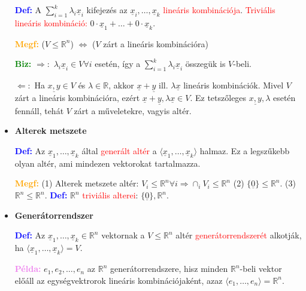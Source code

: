 \documentclass[../../szobeli.tex]{subfiles}
\begin{document}
\begin{itemize}
            \textcolor{blue}{\textbf{Def:}} A $\sum_{i=1}^{k} \lambda_i  \underline{x}_i$ kifejezés az $ \underline{x}_i, \dots,  \underline{x}_k$ \textcolor{red}{lineáris kombinációja}. \textcolor{red}{Triviális lineáris kombináció:} $0 \cdot \underline{x}_1 + \dots + 0 \cdot \underline{x}_k$.

            \textcolor{orange}{\textbf{Megf:}} ($V \leq \mathbb{R}^n$) $\Longleftrightarrow$ ($V$ zárt a lineáris kombinációra)

            \textcolor{green}{\textbf{Biz:}} $\Rightarrow:$ $\lambda_i \underline{x}_i \in V \forall i$ esetén, így a $\sum_{i=1}^{k} \lambda_i \underline{x}_i$ összegük is $V$-beli.

            $\Leftarrow:$ Ha $\underline{x,y} \in V$ és $\lambda \in \mathbb{R}$, akkor $\underline{x} + \underline{y}$ ill. $\lambda \underline{x}$ lineáris kombinációk. Mivel $V$ zárt a lineáris kombinációra, ezért $\underline{x} + \underline{y}, \lambda \underline{x} \in V$. Ez tetszőleges $\underline{x,y}, \lambda$ esetén fennáll, tehát $V$ zárt a műveletekre, vagyis altér.

        \item \textbf{Alterek metszete}
            
            \textcolor{blue}{\textbf{Def:}} Az $\underline{x}_1, \dots, \underline{x}_k$ által \textcolor{red}{generált altér} a $\langle \underline{x}_1, \dots, \underline{x}_k\rangle$ halmaz. Ez a legszűkebb olyan altér, ami mindezen vektorokat tartalmazza.

            \textcolor{orange}{\textbf{Megf:}} (1) Alterek metszete altér: $V_i \leq \mathbb{R}^n \forall i \Rightarrow \cap_i V_i \leq \mathbb{R}^n$ (2) $\{\underline{0}\} \leq \mathbb{R}^n$. (3) $\mathbb{R}^n \leq \mathbb{R}^n$. \textcolor{blue}{\textbf{Def:}} $\mathbb{R}^n$ \textcolor{red}{triviális alterei}: $\{\underline{0}\}, \mathbb{R}^n$.

        \item \textbf{Generátorrendszer}
        
            \textcolor{blue}{\textbf{Def:}} Az $\underline{x}_1, \dots, \underline{x}_k \in \mathbb{R}^n$ vektornak a $V \leq \mathbb{R}^n$ altér \textcolor{red}{generátorrendszerét} alkotják, ha $\langle \underline{x}_1, \dots, \underline{x}_k \rangle = V$.

            \textcolor{violet}{\textbf{Példa:}} $e_1, e_2, \dots, e_n$ az $\mathbb{R}^n$ generátorrendszere, hisz minden $\mathbb{R}^n$-beli vektor előáll az egységvektrorok lineáris kombinációjaként, azaz $\langle e_1, \dots, e_n \rangle = \mathbb{R}^n$. 


\end{itemize}
\end{document}
